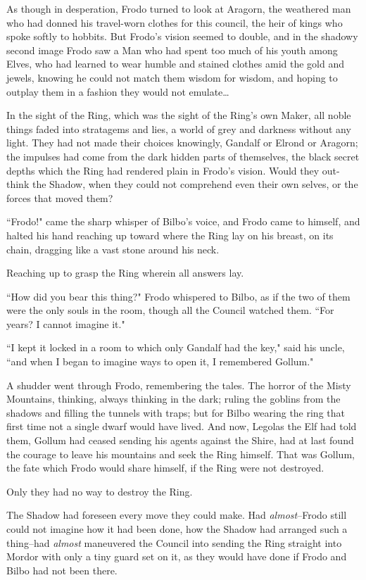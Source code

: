 As though in desperation, Frodo turned to look at Aragorn, the weathered man who had donned his travel-worn clothes for this council, the heir of kings who spoke softly to hobbits. But Frodo's vision seemed to double, and in the shadowy second image Frodo saw a Man who had spent too much of his youth among Elves, who had learned to wear humble and stained clothes amid the gold and jewels, knowing he could not match them wisdom for wisdom, and hoping to outplay them in a fashion they would not emulate{\ldots}

In the sight of the Ring, which was the sight of the Ring's own Maker, all noble things faded into stratagems and lies, a world of grey and darkness without any light. They had not made their choices knowingly, Gandalf or Elrond or Aragorn; the impulses had come from the dark hidden parts of themselves, the black secret depths which the Ring had rendered plain in Frodo's vision. Would they out-think the Shadow, when they could not comprehend even their own selves, or the forces that moved them?

``Frodo!" came the sharp whisper of Bilbo's voice, and Frodo came to himself, and halted his hand reaching up toward where the Ring lay on his breast, on its chain, dragging like a vast stone around his neck.

Reaching up to grasp the Ring wherein all answers lay.

``How did you bear this thing?" Frodo whispered to Bilbo, as if the two of them were the only souls in the room, though all the Council watched them. ``For years? I cannot imagine it."

``I kept it locked in a room to which only Gandalf had the key," said his uncle, ``and when I began to imagine ways to open it, I remembered Gollum."

A shudder went through Frodo, remembering the tales. The horror of the Misty Mountains, thinking, always thinking in the dark; ruling the goblins from the shadows and filling the tunnels with traps; but for Bilbo wearing the ring that first time not a single dwarf would have lived. And now, Legolas the Elf had told them, Gollum had ceased sending his agents against the Shire, had at last found the courage to leave his mountains and seek the Ring himself. That was Gollum, the fate which Frodo would share himself, if the Ring were not destroyed.

Only they had no way to destroy the Ring.

The Shadow had foreseen every move they could make. Had \emph{almost}\---Frodo still could not imagine how it had been done, how the Shadow had arranged such a thing\---had \emph{almost} maneuvered the Council into sending the Ring straight into Mordor with only a tiny guard set on it, as they would have done if Frodo and Bilbo had not been there.

